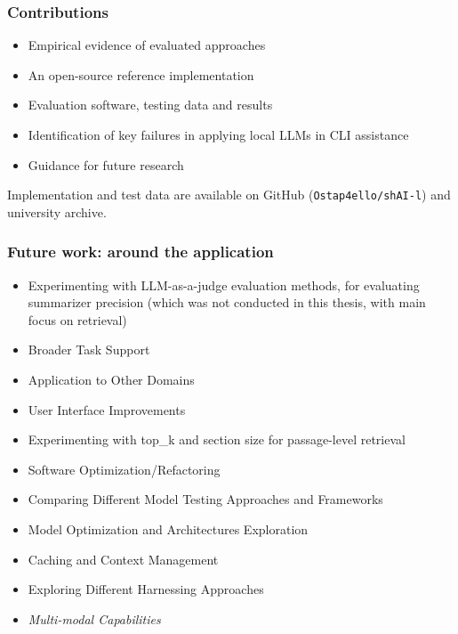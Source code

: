 \documentclass[10pt,aspectratio=169]{beamer}
\begin{document}
\begin{frame}
    \frametitle{Contributions}
    \begin{itemize}
        \item Empirical evidence of evaluated approaches
        \item An open-source reference implementation
        \item Evaluation software, testing data and results
        \item Identification of key failures in applying local LLMs in CLI
            assistance
        \item Guidance for future research
    \end{itemize}
    \vspace{0.5cm}
    \small
    Implementation and test data are available on GitHub
    (\texttt{Ostap4ello/shAI-l}) and university archive.
\end{frame}

\begin{frame}
    \frametitle{Future work: around the application}
    \begin{itemize}
        \footnotesize
        \item Experimenting with LLM-as-a-judge evaluation methods, for
            evaluating summarizer precision (which was not conducted in this
            thesis, with main focus on retrieval)
        \item Broader Task Support
        \item Application to Other Domains
        \item User Interface Improvements
        \item Experimenting with top\_k and section size for passage-level retrieval
        \item Software Optimization/Refactoring

        \vspace{0.5cm}

        \item Comparing Different Model Testing Approaches and Frameworks
        \item Model Optimization and Architectures Exploration
        \item Caching and Context Management
        \item Exploring Different Harnessing Approaches
        \item \textsl{Multi-modal Capabilities}
    \end{itemize}
\end{frame}
\end{document}
